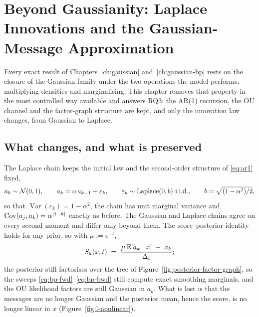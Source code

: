 
\chapter{Beyond Gaussianity: Laplace Innovations and the Gaussian-Message
Approximation}\label{ch:laplace}\label{sec:bp-nongaussian}

Every exact result of Chapters~\ref{ch:gaussian} and~\ref{ch:gaussian-bp}
rests on the closure of the Gaussian family under the two operations the
model performs, multiplying densities and marginalising. This chapter removes
that property in the most controlled way available and answers RQ3: the AR(1)
recursion, the OU channel and the factor-graph structure are kept, and only
the innovation law changes, from Gaussian to Laplace.

\section{What changes, and what is preserved}\label{sec:l-model}\label{sec:l-nonlinear}

The Laplace chain keeps the initial law and the second-order structure of
\eqref{eq:ar1} fixed,
\begin{equation}
  a_0 \sim \mathcal{N}(0,1), \qquad
  a_k = \alpha\, a_{k-1} + \varepsilon_k, \qquad
  \varepsilon_k \sim \mathrm{Laplace}(0, b) \ \text{i.i.d.}, \qquad
  b = \sqrt{(1-\alpha^2)/2},
  \label{eq:l-chain-prior}
\end{equation}
so that $\operatorname{Var}(\varepsilon_k) = 1-\alpha^2$, the chain has unit
marginal variance and $\operatorname{Cov}(a_j,a_k) = \alpha^{|j-k|}$ exactly as before. The
Gaussian and Laplace chains agree on every second moment and differ only
beyond them. The score--posterior identity holds for any prior, so with
$\mu := e^{-t}$,
\begin{equation}
  S_k(x,t) \;=\; \frac{\mu\, \mathbb{E}[a_k \mid x] \;-\; x_k}{\Delta_t} ;
  \label{eq:l-score-identity}
\end{equation}
the posterior still factorises over the tree of
Figure~\ref{fig:posterior-factor-graph}, so the sweeps
\eqref{eq:bp-fwd}--\eqref{eq:bp-bwd} still compute exact smoothing marginals,
and the OU likelihood factors are still Gaussian in $a_k$. What is lost is
that the messages are no longer Gaussian and the posterior mean, hence the
score, is no longer linear in $x$ (Figure~\ref{fig:l-nonlinear}).

